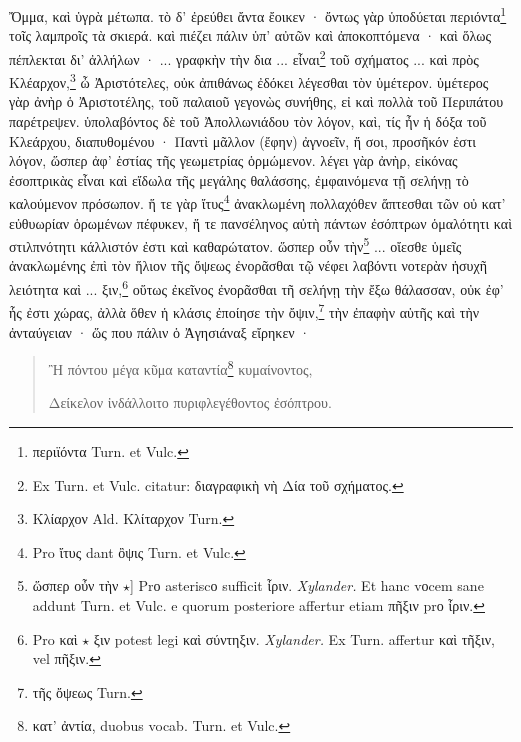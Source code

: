 \documentclass[a4paper, 11pt, oneside, polutonikogreek, german]{article}
\begin{document}
Ὄμμα, καὶ ὑγρὰ μέτωπα. τὸ δ' ἐρεύθει ἄντα ἔοικεν · ὄντως γὰρ ὑποδύεται περιόντα\footnote{περιϊόντα Turn. et Vulc.} τοῖς λαμπροῖς τὰ σκιερά. καὶ πιέζει πάλιν ὑπ' αὐτῶν καὶ ἀποκοπτόμενα · καὶ ὅλως πέπλεκται δι' ἀλλήλων · ... γραφκὴν τὴν δια ... εἶναι\footnote{Ex Turn. et Vulc. citatur: διαγραφικὴ νὴ Δία τοῦ σχήματος.} τοῦ σχήματος ... καὶ πρὸς Κλέαρχον,\footnote{Κλίαρχον Ald. Κλίταρχον Turn.} ὦ Ἀριστότελες, οὐκ ἀπιθάνως ἐδόκει λέγεσθαι τὸν ὑμέτερον. ὑμέτερος γὰρ ἀνὴρ ὁ Ἀριστοτέλης, τοῦ παλαιοῦ γεγονὼς συνήθης, εἰ καὶ πολλὰ τοῦ Περιπάτου παρέτρεψεν. ὑπολαβόντος δὲ τοῦ Ἀπολλωνιάδου τὸν λόγον, καὶ, τίς ἦν ἡ δόξα τοῦ Κλεάρχου, διαπυθομένου · Παντὶ μᾶλλον (ἔφην) ἀγνοεῖν, ἤ σοι, προσῆκόν ἐστι λόγον, ὥσπερ ἀφ' ἑστίας τῆς γεωμετρίας ὁρμώμενον. λέγει γὰρ ἀνὴρ, εἰκόνας ἐσοπτρικὰς εἶναι καὶ εἴδωλα τῆς μεγάλης θαλάσσης, ἐμφαινόμενα τῇ σελήνῃ τὸ καλούμενον πρόσωπον. ἥ τε γὰρ ἴτυς\footnote{Pro ἴτυς dant ὂψις Turn. et Vulc.} ἀνακλωμένη πολλαχόθεν ἅπτεσθαι τῶν οὐ κατ' εὐθυωρίαν ὁρωμένων πέφυκεν, ἥ τε πανσέληνος αὐτὴ πάντων ἐσόπτρων ὁμαλότητι καὶ στιλπνότητι κάλλιστόν ἐστι καὶ καθαρώτατον. ὥσπερ οὖν τὴν\footnote{ὥσπερ οὖν τὴν $\star$] Prο asteriscο sufficit ἶριν. \emph{Xylander.} Et hanc vοcem sane addunt Turn. et Vulc. e quorum posteriore affertur etiam πῆξιν prο ἶριν.} ... οἴεσθε ὑμεῖς ἀνακλωμένης ἐπὶ τὸν ἥλιον τῆς ὄψεως ἐνορᾶσθαι τῷ νέφει λαβόντι νοτερὰν ἡσυχῆ λειότητα καὶ ... ξιν,\footnote{Pro καὶ $\star$ ξιν potest legi καὶ σύντηξιν. \emph{Xylander.} Ex Turn. affertur καὶ τῆξιν, vel πῆξιν.} οὕτως ἐκεῖνος ἐνορᾶσθαι τῆ σελήνῃ τὴν ἔξω θάλασσαν, οὐκ ἐφ' ἧς ἐστι χώρας, ἀλλὰ ὅθεν ἡ κλάσις ἐποίησε τὴν ὄψιν,\footnote{τῆς ὄψεως Turn.} τὴν ἐπαφὴν αὑτῆς καὶ τὴν ἀνταύγειαν · ὥς που πάλιν ὁ Ἀγησιάναξ εἴρηκεν ·
\begin{quotation}\small
Ἢ πόντου μέγα κῦμα καταντία\footnote{κατ' ἀντία, duobus vocab. Turn. et Vulc.} κυμαίνοντος,

Δείκελον ἰνδάλλοιτο πυριφλεγέθοντος ἐσόπτρου.
\end{quotation}
\end{document}
